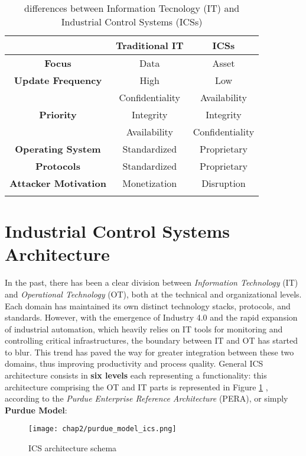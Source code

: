 \bigskip
\begin{longtable}[c]{| c | c | c |}
	\hline
	& \textbf{Traditional IT} & \textbf{ICSs} \\ [0.5ex] 
	\hline
	\textbf{Focus} & Data & Asset \\
	\hline
	\textbf{Update Frequency} & High & Low \\
	\hline 
	\multirow{3}{4em}{\textbf{Priority}} & Confidentiality & Availability \\
	& Integrity & Integrity \\
	& Availability & Confidentiality \\
	\hline
	\textbf{Operating System} & Standardized & Proprietary \\
	\hline
	\textbf{Protocols} & Standardized & Proprietary \\
	\hline
	\textbf{Attacker Motivation} & Monetization & Disruption \\
	\hline
	
	\caption{differences between Information Tecnology (IT) and Industrial Control Systems (ICSs)}
	\label{table:2_it_ot_difference}
\end{longtable}
\vfill

\section{Industrial Control Systems Architecture}
\label{sec:ics_components}
In the past, there has been a clear division between \textit{Information Technology} (IT) and \textit{Operational Technology} (OT), both at the technical and organizational levels. Each domain has maintained its own distinct technology stacks, protocols, and standards. However, with the emergence of Industry 4.0 and the rapid expansion of industrial automation, which heavily relies on IT tools for monitoring and controlling critical infrastructures, the boundary between IT and OT has started to blur. This trend has paved the way for greater integration between these two domains, thus improving productivity and process quality.\newline \newline
General ICS architecture consists in \textbf{six levels} each representing a functionality: this architecture comprising the OT and IT parts is represented in Figure \ref{fig:SCADA_schema} \cite{purdue_model}\cite{tesi_phd_norvegese}, according to the \textit{Purdue Enterprise Reference Architecture} (PERA), or simply \textbf{Purdue Model}:

\begin{figure}[ht]
	\centering
	\texttt{[image: chap2/purdue\_model\_ics.png]}
	\caption{ICS architecture schema}
	\label{fig:SCADA_schema}
\end{figure}

